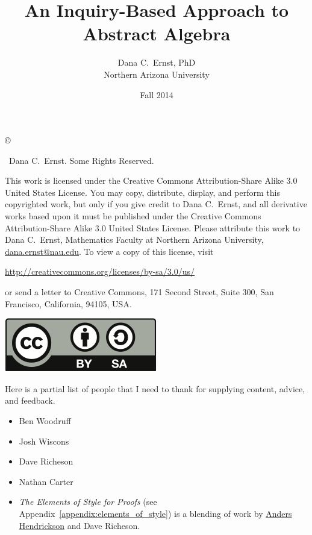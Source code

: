 \documentclass[12pt,oneside]{book}
\theoremstyle{definition}
\begin{document}
\title{An Inquiry-Based Approach to Abstract Algebra}
\author{Dana C.~Ernst, PhD\\
Northern Arizona University}
\date{Fall 2014}

\maketitle
\thispagestyle{empty}

\noindent\copyright{ \the\year\ Dana C.~Ernst.  Some Rights Reserved.\\

\bigskip

\noindent This work is licensed under the Creative Commons Attribution-Share Alike 3.0 United States License.  You may copy, distribute, display, and perform this copyrighted work, but only if you give credit to Dana C.~Ernst, and all derivative works based upon it must be published under the Creative Commons Attribution-Share Alike 3.0 United States License. Please attribute this work to Dana C.~Ernst, Mathematics Faculty at Northern Arizona University, \url{dana.ernst@nau.edu}. To view a copy of this license, visit
\begin{center}
\url{http://creativecommons.org/licenses/by-sa/3.0/us/}
\end{center}
or send a letter to Creative Commons, 171 Second Street, Suite 300, San Francisco, California, 94105, USA.}

\bigskip

\begin{center}
\includegraphics{by-sa.png}
\end{center}

\noindent Here is a partial list of people that I need to thank for supplying content, advice, and feedback.
\begin{itemize}
\item Ben Woodruff
\item Josh Wiscons
\item Dave Richeson
\item Nathan Carter
\item \emph{The Elements of Style for Proofs} (see Appendix~\ref{appendix:elements_of_style}) is a blending of work by \href{http://home.snc.edu/andershendrickson/}{Anders Hendrickson} and Dave Richeson.
\end{itemize}

\tableofcontents
\thispagestyle{empty}

%






%
%
%
%
%
%
\end{document}
